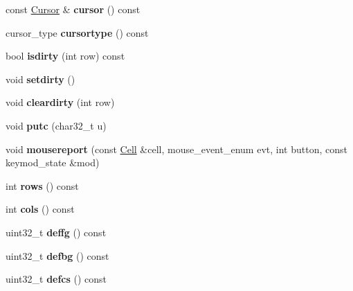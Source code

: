 \begin{DoxyCompactItemize}
const \mbox{\hyperlink{structCursor}{Cursor}} \& {\bfseries cursor} () const
\item 
\mbox{\label{classTermImpl_ab68672ddcd7da97cfcc01cedc2fe06f3}} 
cursor\+\_\+type {\bfseries cursortype} () const
\item 
\mbox{\label{classTermImpl_a7e1e29ec696e8585b5dc379567e5385f}} 
bool {\bfseries isdirty} (int row) const
\item 
\mbox{\label{classTermImpl_a78a76ed3bbe4a414edc6fbee774985b3}} 
void {\bfseries setdirty} ()
\item 
\mbox{\label{classTermImpl_a7f61276bb5b9ce449297c94daae56c89}} 
void {\bfseries cleardirty} (int row)
\item 
\mbox{\label{classTermImpl_a897f4feefd2209430304dfe3eb59b1e4}} 
void {\bfseries putc} (char32\+\_\+t u)
\item 
\mbox{\label{classTermImpl_afb7b7c564709c24511ee3217aceb55be}} 
void {\bfseries mousereport} (const \mbox{\hyperlink{structCell}{Cell}} \&cell, mouse\+\_\+event\+\_\+enum evt, int button, const keymod\+\_\+state \&mod)
\item 
\mbox{\label{classTermImpl_a14f7e991e845bc1f607f8544afa06d96}} 
int {\bfseries rows} () const
\item 
\mbox{\label{classTermImpl_abdceac7ab7d158e103f0f0308fe5343a}} 
int {\bfseries cols} () const
\item 
\mbox{\label{classTermImpl_aea393c864e91456f128f7b2259190f4b}} 
uint32\+\_\+t {\bfseries deffg} () const
\item 
\mbox{\label{classTermImpl_a7d1701c71fbecaf62a3adef18547c748}} 
uint32\+\_\+t {\bfseries defbg} () const
\item 
\mbox{\label{classTermImpl_a1fdd10ac06e24e0ab78e01928a173a02}} 
uint32\+\_\+t {\bfseries defcs} () const
\item 
\mbox{\label{classTermImpl_a8943bd61f2457e8a518d6c42121c82ae}} 

\end{DoxyCompactItemize}
